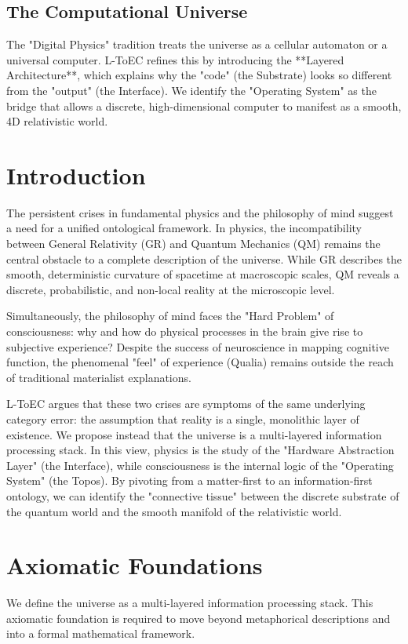 \documentclass[11pt,titlepage]{article}
\begin{document}
\subsection{The Computational Universe}
The "Digital Physics" tradition treats the universe as a cellular automaton or a universal computer. L-ToEC refines this by introducing the **Layered Architecture**, which explains why the "code" (the Substrate) looks so different from the "output" (the Interface). We identify the "Operating System" as the bridge that allows a discrete, high-dimensional computer to manifest as a smooth, 4D relativistic world.


\section{Introduction}
\label{sec:intro}
The persistent crises in fundamental physics and the philosophy of mind suggest a need for a unified ontological framework. In physics, the incompatibility between General Relativity (GR) and Quantum Mechanics (QM) remains the central obstacle to a complete description of the universe. While GR describes the smooth, deterministic curvature of spacetime at macroscopic scales, QM reveals a discrete, probabilistic, and non-local reality at the microscopic level.

Simultaneously, the philosophy of mind faces the "Hard Problem" of consciousness: why and how do physical processes in the brain give rise to subjective experience? Despite the success of neuroscience in mapping cognitive function, the phenomenal "feel" of experience (Qualia) remains outside the reach of traditional materialist explanations.

L-ToEC argues that these two crises are symptoms of the same underlying category error: the assumption that reality is a single, monolithic layer of existence. We propose instead that the universe is a multi-layered information processing stack. In this view, physics is the study of the "Hardware Abstraction Layer" (the Interface), while consciousness is the internal logic of the "Operating System" (the Topos). By pivoting from a matter-first to an information-first ontology, we can identify the "connective tissue" between the discrete substrate of the quantum world and the smooth manifold of the relativistic world.


\section{Axiomatic Foundations}
\label{sec:axioms}
We define the universe as a multi-layered information processing stack. This axiomatic foundation is required to move beyond metaphorical descriptions and into a formal mathematical framework.
\end{document}
